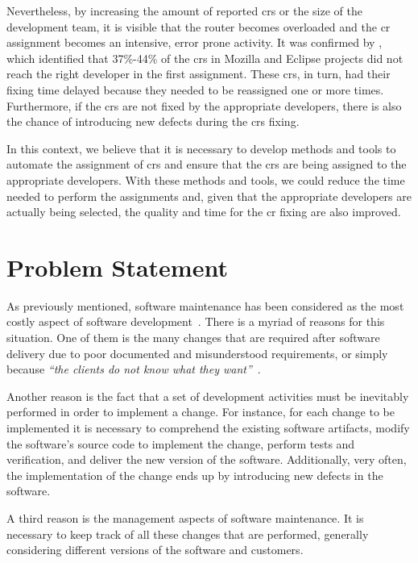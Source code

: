 Nevertheless, by increasing the amount of reported \acp{cr} or the size of the
development team, it is visible that the router becomes overloaded and the
\ac{cr} assignment becomes an intensive, error prone activity. It was confirmed
by \citet{Jeong2009}, which identified that 37\%-44\% of the \acp{cr} in Mozilla
and Eclipse projects did not reach the right developer in the first assignment.
These \acp{cr}, in turn, had their fixing time delayed because they needed to be
reassigned one or more times. Furthermore, if the \acp{cr} are not fixed by the
appropriate developers, there is also the chance of introducing new defects
during the \acp{cr} fixing.

In this context, we believe that it is necessary to develop methods and tools to
automate the assignment of \acp{cr} and ensure that the \acp{cr} are being
assigned to the appropriate developers. With these methods and tools, we could
reduce the time needed to perform the assignments and, given that the
appropriate developers are actually being selected, the quality and time for the
\ac{cr} fixing are also improved.

\section{Problem Statement}
\label{sec:intro-problem-statement}

As previously mentioned, software maintenance has been considered as the most
costly aspect of software development~\citep{swebok2004}. There is a myriad of
reasons for this situation. One of them is the many changes that are required
after software delivery due to poor documented and misunderstood requirements,
or simply because \emph{``the clients do not know what they
want''}~\citep{Brooks1995}.

Another reason is the fact that a set of development activities must be
inevitably performed in order to implement a change. For instance, for each
change to be implemented it is necessary to comprehend the existing software
artifacts, modify the software's source code to implement the change, perform
tests and verification, and deliver the new version of the software.
Additionally, very often, the implementation of the change ends up by
introducing new defects in the software.

A third reason is the management aspects of software maintenance. It is
necessary to keep track of all these changes that are performed, generally
considering different versions of the software and customers.


